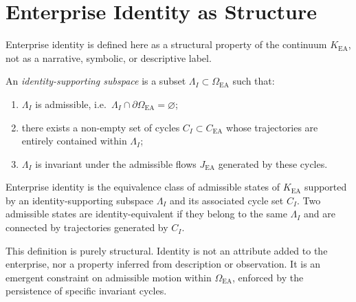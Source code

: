 ﻿\section{Enterprise Identity as Structure}

Enterprise identity is defined here as a structural property of the continuum
$K_{\mathrm{EA}}$, not as a narrative, symbolic, or descriptive label.

\begin{definition}
An \emph{identity-supporting subspace} is a subset
$\Lambda_I \subset \Omega_{\mathrm{EA}}$ such that:
\begin{enumerate}
  \item $\Lambda_I$ is admissible, i.e.\ $\Lambda_I \cap \partial\Omega_{\mathrm{EA}} = \varnothing$;
  \item there exists a non-empty set of cycles $C_I \subset C_{\mathrm{EA}}$
        whose trajectories are entirely contained within $\Lambda_I$;
  \item $\Lambda_I$ is invariant under the admissible flows $J_{\mathrm{EA}}$
        generated by these cycles.
\end{enumerate}
\end{definition}

\begin{definition}
Enterprise identity is the equivalence class of admissible states of
$K_{\mathrm{EA}}$ supported by an identity-supporting subspace $\Lambda_I$ and its
associated cycle set $C_I$. Two admissible states are identity-equivalent if they
belong to the same $\Lambda_I$ and are connected by trajectories generated by
$C_I$.
\end{definition}

This definition is purely structural. Identity is not an attribute added to the
enterprise, nor a property inferred from description or observation. It is an
emergent constraint on admissible motion within $\Omega_{\mathrm{EA}}$, enforced
by the persistence of specific invariant cycles.
